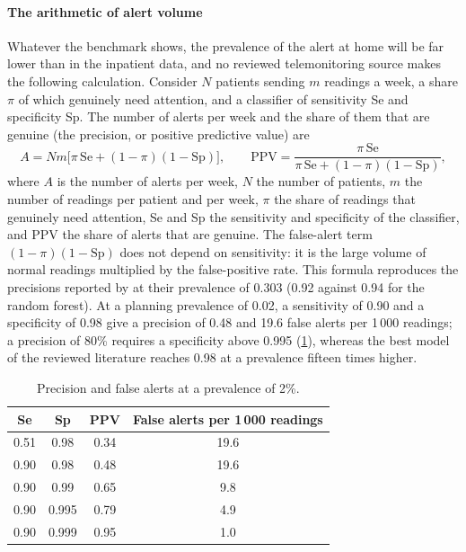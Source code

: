 \paragraph{The arithmetic of alert volume} Whatever the benchmark shows, the prevalence of the alert at home will be far lower than in the inpatient data, and no reviewed telemonitoring source makes the following calculation. Consider $N$ patients sending $m$ readings a week, a share $\pi$ of which genuinely need attention, and a classifier of sensitivity Se and specificity Sp. The number of alerts per week and the share of them that are genuine (the precision, or positive predictive value) are
\begin{equation}
  A = N m \bigl[\pi\,\mathrm{Se} + (1-\pi)(1-\mathrm{Sp})\bigr], \qquad
  \mathrm{PPV} = \frac{\pi\,\mathrm{Se}}{\pi\,\mathrm{Se} + (1-\pi)(1-\mathrm{Sp})},
\end{equation}
where $A$ is the number of alerts per week, $N$ the number of patients, $m$ the number of readings per patient and per week, $\pi$ the share of readings that genuinely need attention, Se and Sp the sensitivity and specificity of the classifier, and PPV the share of alerts that are genuine. The false-alert term $(1-\pi)(1-\mathrm{Sp})$ does not depend on sensitivity: it is the large volume of normal readings multiplied by the false-positive rate. This formula reproduces the precisions reported by \textcite{mendoza2025} at their prevalence of 0.303 (0.92 against 0.94 for the random forest). At a planning prevalence of 0.02, a sensitivity of 0.90 and a specificity of 0.98 give a precision of 0.48 and 19.6 false alerts per 1\,000 readings; a precision of 80\% requires a specificity above 0.995 (\cref{tab:ppv}), whereas the best model of the reviewed literature reaches 0.98 at a prevalence fifteen times higher.

\begin{table}[htbp]
\centering\small
\caption{Precision and false alerts at a prevalence of 2\%.}\label{tab:ppv}
\begin{tabular}{@{}cccc@{}}
\toprule
\textbf{Se} & \textbf{Sp} & \textbf{PPV} & \textbf{False alerts per 1\,000 readings} \\
\midrule
0.51 & 0.98 & 0.34 & 19.6 \\
0.90 & 0.98 & 0.48 & 19.6 \\
0.90 & 0.99 & 0.65 & 9.8 \\
0.90 & 0.995 & 0.79 & 4.9 \\
0.90 & 0.999 & 0.95 & 1.0 \\
\bottomrule
\end{tabular}
\end{table}

